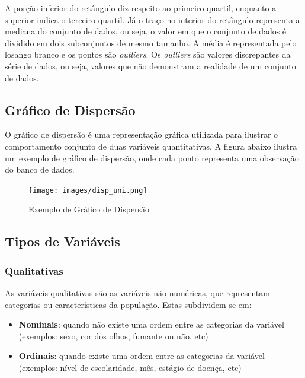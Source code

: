 \documentclass[
]{estat/estat}
\providecommand{\tightlist}{%
  \setlength{\itemsep}{0pt}\setlength{\parskip}{0pt}}\usepackage{longtable,booktabs,array}
\begin{document}
A porção inferior do retângulo diz respeito ao primeiro quartil,
enquanto a superior indica o terceiro quartil. Já o traço no interior do
retângulo representa a mediana do conjunto de dados, ou seja, o valor em
que o conjunto de dados é dividido em dois subconjuntos de mesmo
tamanho. A média é representada pelo losango branco e os pontos são
\emph{outliers}. Os \emph{outliers} são valores discrepantes da série de
dados, ou seja, valores que não demonstram a realidade de um conjunto de
dados.

\subsection{Gráfico de Dispersão}\label{gruxe1fico-de-dispersuxe3o}

O gráfico de dispersão é uma representação gráfica utilizada para
ilustrar o comportamento conjunto de duas variáveis quantitativas. A
figura abaixo ilustra um exemplo de gráfico de dispersão, onde cada
ponto representa uma observação do banco de dados.

\begin{figure}[H]

\caption{Exemplo de Gráfico de Dispersão}

{\centering \texttt{[image: images/disp\_uni.png]}

}

\end{figure}%

\subsection{Tipos de Variáveis}\label{tipos-de-variuxe1veis}

\subsubsection{Qualitativas}\label{qualitativas}

As variáveis qualitativas são as variáveis não numéricas, que
representam categorias ou características da população. Estas
subdividem-se em:

\begin{itemize}
\tightlist
\item
  \textbf{Nominais}: quando não existe uma ordem entre as categorias da
  variável (exemplos: sexo, cor dos olhos, fumante ou não, etc)
\item
  \textbf{Ordinais}: quando existe uma ordem entre as categorias da
  variável (exemplos: nível de escolaridade, mês, estágio de doença,
  etc)
\end{itemize}
\end{document}
